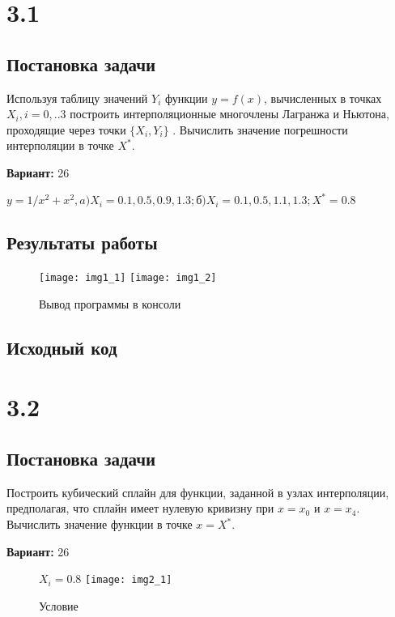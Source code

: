 \section* {3.1}

\subsection{Постановка задачи}
Используя таблицу значений $Y_i$  функции $y=f(x)$, вычисленных в точках   $X_i, i=0,..3$  построить интерполяционные многочлены Лагранжа и Ньютона, проходящие через точки $\{X_i,Y_i \}$ .  Вычислить значение погрешности интерполяции в точке $X^*$. 

{\bfseries Вариант:} 26

$y=1/x^2 + x^2, a)X_i= 0.1,0.5,0.9,1.3;  б)X_i= 0.1,0.5,1.1,1.3; X^* = 0.8$

\subsection{Результаты работы}
\begin{figure}[h!]
\centering
\texttt{[image: img1\_1]}
\texttt{[image: img1\_2]}
\caption{Вывод программы в консоли}
\end{figure}
\pagebreak


\subsection{Исходный код}


\pagebreak

\section* {3.2}

\subsection{Постановка задачи}
Построить кубический сплайн для функции, заданной в узлах интерполяции, предполагая, что сплайн имеет нулевую кривизну при $x=x_0$  и $x=x_4$. Вычислить значение функции в точке $x=X^*$. 

{\bfseries Вариант:} 26
\begin{figure}[h!]
$X_i=0.8$
\centering
\texttt{[image: img2\_1]}
\caption{Условие}
\end{figure}

